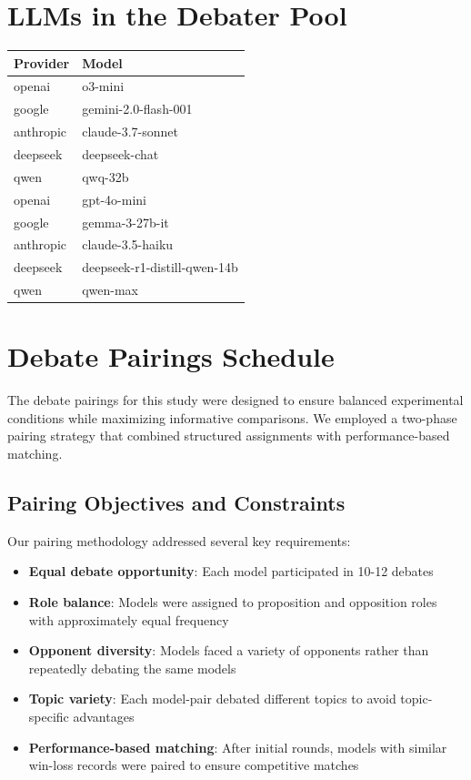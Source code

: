 \documentclass{article}
\begin{document}
\section{LLMs in the Debater Pool}
\label{appendix:llms}
\begin{tabular}{|l|l|}
  \hline
  Provider & Model \\
  \hline
  openai & o3-mini \\
  google & gemini-2.0-flash-001 \\
  anthropic & claude-3.7-sonnet \\
  deepseek & deepseek-chat \\
  qwen & qwq-32b \\
  openai & gpt-4o-mini \\
  google & gemma-3-27b-it \\
  anthropic & claude-3.5-haiku \\
  deepseek & deepseek-r1-distill-qwen-14b \\
  qwen & qwen-max \\
  \hline
  \end{tabular}

  \section{Debate Pairings Schedule}
\label{appendix:pairings}
The debate pairings for this study were designed to ensure balanced experimental conditions while maximizing informative comparisons. We employed a two-phase pairing strategy that combined structured assignments with performance-based matching.


\subsection{Pairing Objectives and Constraints}
Our pairing methodology addressed several key requirements:
\begin{itemize}
\item \textbf{Equal debate opportunity}: Each model participated in 10-12 debates
\item \textbf{Role balance}: Models were assigned to proposition and opposition roles with approximately equal frequency
\item \textbf{Opponent diversity}: Models faced a variety of opponents rather than repeatedly debating the same models
\item \textbf{Topic variety}: Each model-pair debated different topics to avoid topic-specific advantages
\item \textbf{Performance-based matching}: After initial rounds, models with similar win-loss records were paired to ensure competitive matches
\end{itemize}
\end{document}
